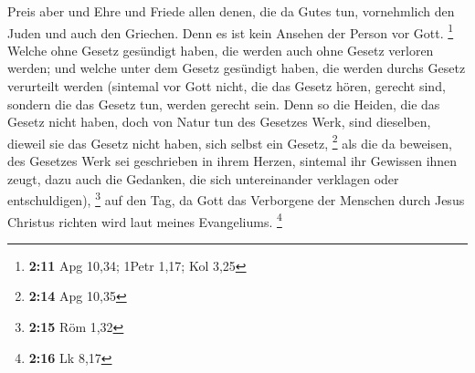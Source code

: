  Preis aber und Ehre und Friede allen denen, die da Gutes
tun, vornehmlich den Juden und auch den Griechen.  Denn
es ist kein Ansehen der Person vor Gott. \footnote{\textbf{2:11} Apg
  10,34; 1Petr 1,17; Kol 3,25}  Welche ohne Gesetz
gesündigt haben, die werden auch ohne Gesetz verloren werden; und welche
unter dem Gesetz gesündigt haben, die werden durchs Gesetz verurteilt
werden  (sintemal vor Gott nicht, die das Gesetz hören,
gerecht sind, sondern die das Gesetz tun, werden gerecht sein.
 Denn so die Heiden, die das Gesetz nicht haben, doch von
Natur tun des Gesetzes Werk, sind dieselben, dieweil sie das Gesetz
nicht haben, sich selbst ein Gesetz, \footnote{\textbf{2:14} Apg 10,35}
 als die da beweisen, des Gesetzes Werk sei geschrieben
in ihrem Herzen, sintemal ihr Gewissen ihnen zeugt, dazu auch die
Gedanken, die sich untereinander verklagen oder entschuldigen),
\footnote{\textbf{2:15} Röm 1,32}  auf den Tag, da Gott
das Verborgene der Menschen durch Jesus Christus richten wird laut
meines Evangeliums. \footnote{\textbf{2:16} Lk 8,17}

